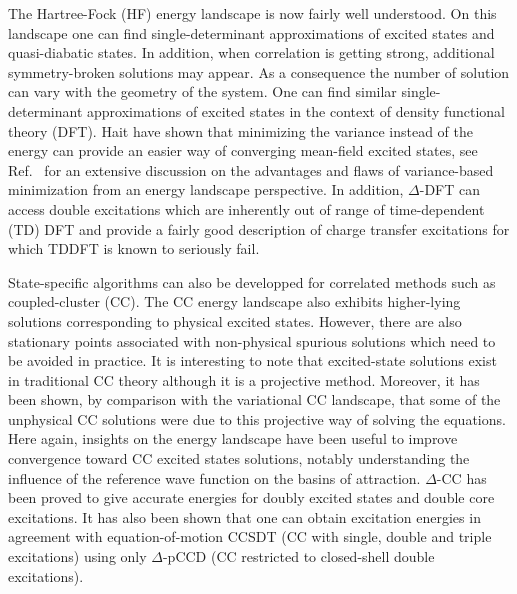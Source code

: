 \documentclass[aps,prb,reprint,showkeys,superscriptaddress]{revtex4-1}
\begin{document}
The Hartree-Fock (HF) \cite{Szabo_1996} energy landscape is now fairly well understood.\cite{Thompson_2018,Dong_2020,Burton_2021}
On this landscape one can find single-determinant approximations of excited states \cite{Gilbert_2008,Barca_2014} and quasi-diabatic states. \cite{Thom_2009}
In addition, when correlation is getting strong, additional symmetry-broken solutions may appear.\cite{Coulson_1949}
As a consequence the number of solution can vary with the geometry of the system.
One can find similar single-determinant approximations of excited states in the context of density functional theory (DFT). \cite{Hait_2020,Hait_2021}
Hait \etal have shown that minimizing the variance instead of the energy can provide an easier way of converging mean-field excited states, \cite{Hait_2020} see Ref.~ for an extensive discussion on the advantages and flaws of variance-based minimization from an energy landscape perspective.
In addition, $\Delta$-DFT can access double excitations which are inherently out of range of time-dependent (TD) DFT \cite{Hait_2021} and provide a fairly good description of charge transfer excitations for which TDDFT is known to seriously fail. \cite{Tozer_2003,Dreuw_2004,Hait_2021} 

State-specific algorithms can also be developped for correlated methods such as coupled-cluster (CC). \cite{Shavitt_2009}
The CC energy landscape also exhibits higher-lying solutions corresponding to physical excited states. \cite{Jankowski_1994,Jankowski_1994a,Piecuch_2000,Mayhall_2010,Lee_2019,Kossoski_2021}
However, there are also stationary points associated with non-physical spurious solutions which need to be avoided in practice. \cite{Jankowski_1994,Jankowski_1994a,Piecuch_2000,Mayhall_2010,Kossoski_2021,Marie_2021a}
It is interesting to note that excited-state solutions exist in traditional CC theory although it is a projective method.
Moreover, it has been shown, by comparison with the variational CC landscape, that some of the unphysical CC solutions were due to this projective way of solving the equations. \cite{Marie_2021}
Here again, insights on the energy landscape have been useful to improve convergence toward CC excited states solutions, notably understanding the influence of the reference wave function on the basins of attraction. \cite{Jankowski_1995,Lee_2019,Marie_2021a}
$\Delta$-CC has been proved to give accurate energies for doubly excited states and double core excitations. \cite{Lee_2019}
It has also been shown that one can obtain excitation energies in agreement with equation-of-motion CCSDT (CC with single, double and triple excitations) using only $\Delta$-pCCD (CC restricted to closed-shell double excitations). \cite{Kossoski_2021}
\end{document}
